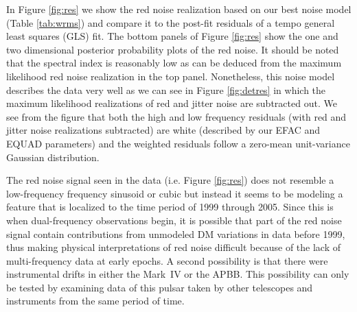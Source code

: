 In Figure \ref{fig:res} we show the red noise realization based on our best
noise model (Table \ref{tab:wrms}) and compare it to the post-fit residuals of
a {\sc tempo} general least squares (GLS) fit. The bottom
panels of Figure \ref{fig:res} show the one and two dimensional posterior probability plots
of the red noise. It should be noted that the spectral index is reasonably low as can be 
deduced from the maximum likelihood red noise realization in the top panel. Nonetheless, this noise model describes
the data very well as we can see in Figure \ref{fig:detres} in which the maximum likelihood realizations of red and jitter noise are subtracted out. We see from the figure that both the high and low frequency residuals (with red and jitter noise realizations subtracted) are white (described by our EFAC and EQUAD parameters) and the weighted residuals follow a zero-mean unit-variance Gaussian distribution.



The red noise signal seen in the data (i.e. Figure \ref{fig:res}) does not
resemble a low-frequency frequency sinusoid or cubic
but instead it seems to be modeling a feature that is
localized to the time period of 1999 through 2005. Since this is when
dual-frequency observations begin, it is possible that part of the red noise
signal contain contributions from unmodeled DM variations in data before 1999, 
thus making physical interpretations of red noise difficult because of the lack of multi-frequency data at early epochs.
A second possibility is that there were instrumental drifts in either the
Mark~IV or the APBB. This possibility can only be tested by examining data of
this pulsar taken by other telescopes and instruments from the same period of
time. 

